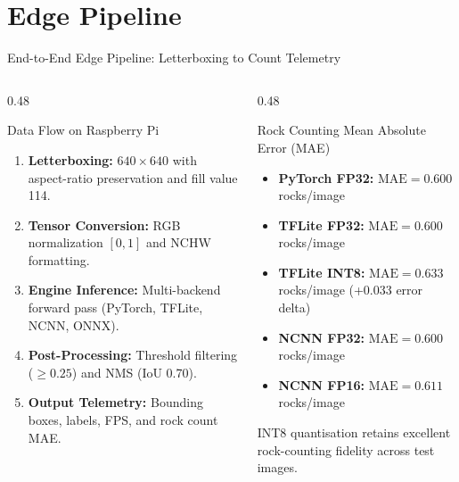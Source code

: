 \documentclass[aspectratio=169,10pt]{beamer}
\begin{document}
\section{Edge Pipeline}
\begin{frame}{End-to-End Edge Pipeline: Letterboxing to Count Telemetry}
\begin{columns}[T]
  \begin{column}{0.48\textwidth}
    \begin{block}{\small Data Flow on Raspberry Pi}
      \small
      \begin{enumerate}
        \item \textbf{Letterboxing:} $640\times640$ with aspect-ratio preservation and fill value 114.
        \item \textbf{Tensor Conversion:} RGB normalization $[0, 1]$ and NCHW formatting.
        \item \textbf{Engine Inference:} Multi-backend forward pass (PyTorch, TFLite, NCNN, ONNX).
        \item \textbf{Post-Processing:} Threshold filtering ($\ge 0.25$) and NMS (IoU 0.70).
        \item \textbf{Output Telemetry:} Bounding boxes, labels, FPS, and rock count MAE.
      \end{enumerate}
    \end{block}
  \end{column}
  \begin{column}{0.48\textwidth}
    \begin{block}{\small Rock Counting Mean Absolute Error (MAE)}
      \small
      \begin{itemize}
        \item \textbf{PyTorch FP32:} $\text{MAE} = 0.600$ rocks/image
        \item \textbf{TFLite FP32:} $\text{MAE} = 0.600$ rocks/image
        \item \textbf{TFLite INT8:} $\text{MAE} = 0.633$ rocks/image (+0.033 error delta)
        \item \textbf{NCNN FP32:} $\text{MAE} = 0.600$ rocks/image
        \item \textbf{NCNN FP16:} $\text{MAE} = 0.611$ rocks/image
      \end{itemize}
      \vspace{2pt}
      INT8 quantisation retains excellent rock-counting fidelity across test images.
    \end{block}
  \end{column}
\end{columns}
\end{frame}
\end{document}
